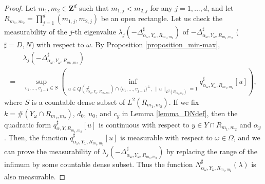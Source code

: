 \documentclass[12pt,a4paper]{article}
\begin{document}
\begin{proof}
Let $m_1,m_2\in \mathbf{Z}^d$ such that $m_{1,j}<m_{2,j}$ for any $j=1,...,d$,
and let $R_{m_1,m_2}=\prod_{j=1}^d(m_{1,j},m_{2,j})$ be an open rectangle.
Let us check the measurability of 
the $j$-th eigenvalue
$\lambda_j(-\Delta^\sharp_{\alpha_\omega,Y_\omega,R_{m_1,m_2}})$
of $-\Delta^\sharp_{\alpha_\omega,Y_\omega,R_{m_1,m_2}}$ 
($\sharp=D,N$) 
with respect to $\omega$.
By Proposition \ref{proposition_min-max},
\begin{align*}
&\  \lambda_j(-\Delta^\sharp_{\alpha_\omega,Y_\omega,R_{m_1,m_2}})\\
=&\ \sup_{v_1,\ldots,v_{j-1}\in S}
\left(
\inf_{u\in Q(q^\sharp_{\alpha_\omega,Y_\omega,R_{m_1,m_2}})\cap 
\langle v_1,\ldots,v_{j-1}\rangle^\bot
,\,
\|u\|_{L^2(R_{m_1,m_2})}=1
}q^\sharp_{\alpha_\omega,Y_\omega,R_{m_1,m_2}}[u]
\right),
\end{align*}
where $S$ is a countable dense subset of $L^2(R_{m_1,m_2})$.
If we fix $k=\#(Y_\omega\cap R_{m_1,m_2})$,
$d_0$, $u_0$, and $c_y$ in Lemma \ref{lemma_DNdef},
then the quadratic form $q^\sharp_{\alpha,Y,R_{m_1,m_2}}[u]$ 
is continuous with respect to $y\in Y\cap R_{m_1,m_2}$ and  $\alpha_y$.
Then, the function 
$q^\sharp_{\alpha_\omega,Y_\omega,R_{m_1,m_2}}[u]$ 
is measurable with respect to $\omega\in \Omega$,
and we can prove the measurability of $\lambda_j(-\Delta^\sharp_{\alpha_\omega,Y_\omega,R_{m_1,m_2}})$
by replacing the range of the infimum by some countable dense subset.
Thus the function $N^\sharp_{\alpha_\omega,Y_\omega,R_{m_1,m_2}}(\lambda)$
is also measurable.


\end{proof}
\end{document}

